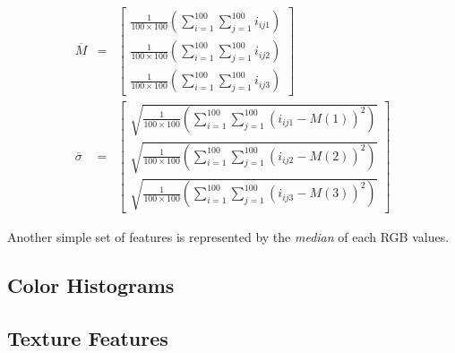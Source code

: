 \begin{eqnarray}
 \overline{M} & = & \left[ \begin{array}{c}
                            \frac{1}{100\times100} \left( \sum_{i=1}^{100} \sum_{j=1}^{100} i_{ij1} \right) \\
                            \frac{1}{100\times100} \left( \sum_{i=1}^{100} \sum_{j=1}^{100} i_{ij2} \right) \\
                            \frac{1}{100\times100} \left( \sum_{i=1}^{100} \sum_{j=1}^{100} i_{ij3} \right)
                           \end{array} \right] \\
 \overline{\sigma} & = & \left[ \begin{array}{c}
                                 \sqrt{\frac{1}{100\times100} \left( \sum_{i=1}^{100} \sum_{j=1}^{100} (i_{ij1} - M(1) )^2 \right)} \\
                                 \sqrt{\frac{1}{100\times100} \left( \sum_{i=1}^{100} \sum_{j=1}^{100} (i_{ij2} - M(2) )^2 \right)} \\
                                 \sqrt{\frac{1}{100\times100} \left( \sum_{i=1}^{100} \sum_{j=1}^{100} (i_{ij3} - M(3) )^2 \right)}
                                \end{array}  \right]
\end{eqnarray}

Another simple set of features is represented by the \textit{median} of each RGB values. 




\vspace{0.5cm}

\subsection{Color Histograms}




\vspace{0.5cm}

\subsection{Texture Features}




